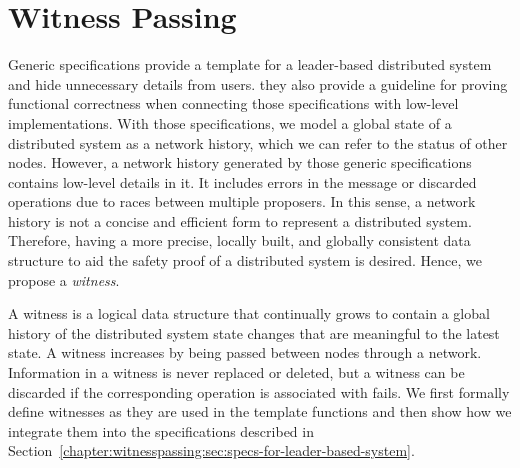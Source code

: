 \section{Witness Passing}
\label{chapter:witnesspassing:sec:witness-passing}

Generic specifications provide a template for a leader-based distributed system and hide unnecessary details from users. they also provide a guideline for proving functional correctness when connecting  those specifications with
low-level implementations.
With those specifications,  we model a global state of a distributed system as a network history, which we can refer to the status of other nodes.
However, a network history generated by those generic specifications contains low-level details in it.
It includes errors in the message or discarded operations due to races between multiple proposers.
In this sense, a network history is not a concise and efficient form to represent a distributed system. 
Therefore, having a more precise, 
locally built, and globally consistent data structure to aid the safety proof of a distributed system is desired. Hence, we propose a \textit{witness}.

A witness is a logical data structure that continually grows to contain a global
history of the distributed system state changes that are meaningful to the
latest state. A witness increases by being passed between nodes through a network.
Information in a witness is never replaced or deleted, but a witness can be discarded if the corresponding operation is associated with fails.
We first formally define witnesses as they are used in the template functions
and then show how we integrate them into the specifications described in Section~\ref{chapter:witnesspassing:sec:specs-for-leader-based-system}.



